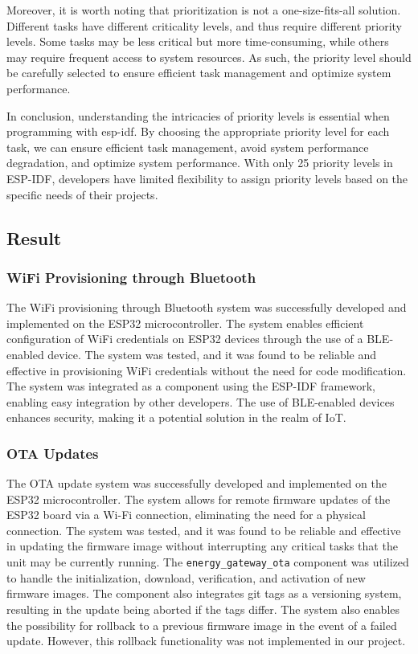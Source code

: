 Moreover, it is worth noting that prioritization is not a one-size-fits-all solution. Different tasks have different criticality levels, and thus require different priority levels. Some tasks may be less critical but more time-consuming, while others may require frequent access to system resources. As such, the priority level should be carefully selected to ensure efficient task management and optimize system performance.

In conclusion, understanding the intricacies of priority levels is essential when programming with esp-idf. By choosing the appropriate priority level for each task, we can ensure efficient task management, avoid system performance degradation, and optimize system performance. With only 25 priority levels in ESP-IDF, developers have limited flexibility to assign priority levels based on the specific needs of their projects.

\subsection{Result}\label{sec:result}

\subsubsection{WiFi Provisioning through Bluetooth}

The WiFi provisioning through Bluetooth system was successfully developed and implemented on the ESP32 microcontroller. The system enables efficient configuration of WiFi credentials on ESP32 devices through the use of a BLE-enabled device. The system was tested, and it was found to be reliable and effective in provisioning WiFi credentials without the need for code modification. The system was integrated as a component using the ESP-IDF framework, enabling easy integration by other developers. The use of BLE-enabled devices enhances security, making it a potential solution in the realm of IoT.

\subsubsection{OTA Updates}

The OTA update system was successfully developed and implemented on the ESP32 microcontroller. The system allows for remote firmware updates of the ESP32 board via a Wi-Fi connection, eliminating the need for a physical connection. The system was tested, and it was found to be reliable and effective in updating the firmware image without interrupting any critical tasks that the unit may be currently running. The \texttt{energy\_gateway\_ota} component was utilized to handle the initialization, download, verification, and activation of new firmware images. The component also integrates git tags as a versioning system, resulting in the update being aborted if the tags differ. The system also enables the possibility for rollback to a previous firmware image in the event of a failed update. However, this rollback functionality was not implemented in our project.

